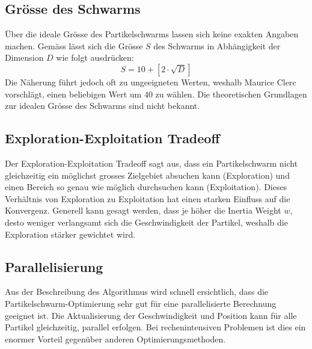 \subsection{Grösse des Schwarms}
Über die ideale Grösse des Partikelschwarms lassen sich keine exakten Angaben machen. Gemäss \cite{Clerc-Standards} lässt sich die Grösse $S$ des Schwarms in Abhängigkeit der Dimension $D$ wie folgt ausdrücken:
\begin{equation}
	S = 10 + \left[ 2 \cdot \sqrt{D} \right]
\end{equation}
Die Näherung führt jedoch oft zu ungeeigneten Werten, weshalb Maurice Clerc vorschlägt, einen beliebigen Wert um $40$ zu wählen. Die theoretischen Grundlagen zur idealen Grösse des Schwarms sind nicht bekannt.


\subsection{Exploration-Exploitation Tradeoff}
Der Exploration-Exploitation Tradeoff sagt aus, dass ein Partikelschwarm nicht gleichzeitig ein möglichst grosses Zielgebiet absuchen kann (Exploration) und einen Bereich so genau wie möglich durchsuchen kann (Exploitation). Dieses Verhältnis von Exploration zu Exploitation hat einen starken Einfluss auf die Konvergenz. Generell kann gesagt werden, dass je höher die Inertia Weight $w$, desto weniger verlangsamt sich die Geschwindigkeit der Partikel, weshalb die Exploration stärker gewichtet wird.

\subsection{Parallelisierung}
Aus der Beschreibung des Algorithmus wird schnell ersichtlich, dass die Partikelschwarm-Optimierung sehr gut für eine parallelisierte Berechnung geeignet ist. Die Aktualisierung der Geschwindigkeit und Position kann für alle Partikel gleichzeitig, parallel erfolgen. Bei rechenintensiven Problemen ist dies ein enormer Vorteil gegenüber anderen Optimierungsmethoden.